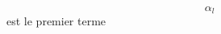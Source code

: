 \documentclass[preview]{standalone}
\begin{document}
\begin{center}
$$\alpha_l$$ est le premier terme
\end{center}
\end{document}

